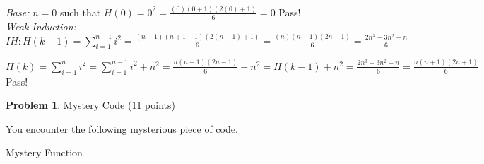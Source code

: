 \documentclass[11pt]{article}
\theoremstyle{definition}
\theoremstyle{theorem}
\newtheorem{prob}{Problem}
\newcommand{\solution}{\medskip\noindent{\color{DarkBlue}\textbf{Solution:}}}
\begin{document}
\solution \\

\emph{Base:} $n = 0$  such that $H(0) = 0^2 = \frac{(0)(0+1)(2(0)+1)}{6} = 0$ Pass! \\

\emph{Weak Induction:} \\

 $IH: H(k-1) =  \sum_{i=1}^{n-1} i^2 = \frac{(n-1)(n+1-1)(2(n-1)+1)}{6}  = \frac{(n)(n-1)(2n-1)}{6} = \frac{2n^3-3n^2+n}{6}$
	
 $H(k) = \sum_{i=1}^{n} i^2 =  \sum_{i=1}^{n-1} i^2  + n^2=  \frac{n(n-1)(2n-1)}{6} + n^2 = H(k-1) + n^2 =  \frac{2n^3+3n^2+n}{6} =  \frac{n(n+1)(2n+1)}{6}$ Pass!


\newpage
\begin{prob} Mystery Code (11 points) \end{prob}

You encounter the following mysterious piece of code.

\begin{algorithm}[H]
\caption{Mystery Function}
\end{algorithm}
\end{document}
